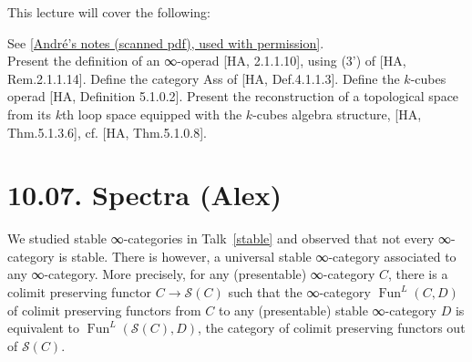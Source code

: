 \documentclass[a4paper]{amsart}
\numberwithin{figure}{section}
\theoremstyle{theorem}
\theoremstyle{definition}
\newcommand{\Sp}{{\mathcal{S}}}
\DeclareMathOperator{\Fun}{Fun}
\begin{document}
This lecture will cover the following:

See \href{InfCat9Op.pdf}{[André's notes (scanned pdf), used with permission]}. \\%

Present the definition of an ∞-operad [HA, 2.1.1.10], using (3') of [HA, Rem.2.1.1.14]. %
Define the category Ass of [HA, Def.4.1.1.3]. %
Define the $k$-cubes operad [HA, Definition 5.1.0.2]. %
Present the reconstruction of a topological space from its $k$th loop space equipped with the $k$-cubes algebra structure, [HA, Thm.5.1.3.6], cf. [HA, Thm.5.1.0.8]. %



%
%
%

\section{10.07. Spectra (Alex)}

We studied stable ∞-categories in Talk~\ref{stable} and observed that not every ∞-category is stable. There is however, a universal stable ∞-category associated to any ∞-category. More precisely, for any (presentable) ∞-category $C$, there is a colimit preserving functor  $C → \Sp(C)$ such that the ∞-category $\Fun^L(C, D)$ of colimit preserving functors from $C$ to any (presentable) stable ∞-category $D$ is equivalent to $\Fun^L(\Sp(C), D)$, the category of colimit preserving functors out of $\Sp(C)$.
\end{document}
